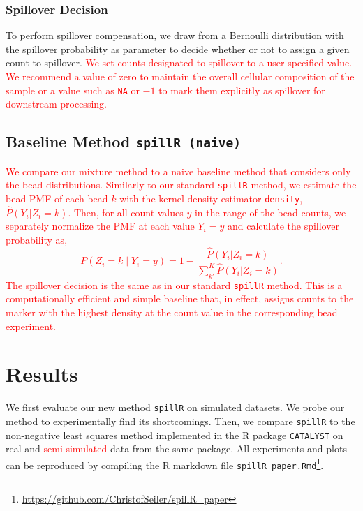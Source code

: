 \documentclass[
]{article}
\begin{document}
\subsubsection{Spillover Decision}\label{spillover-decision}

To perform spillover compensation, we draw from a Bernoulli distribution with the spillover probability as parameter to decide whether or not to assign a given count to spillover. \textcolor{red}{We set counts designated to spillover to a user-specified value. We recommend a value of zero to maintain the overall cellular composition of the sample or a value such as \texttt{NA} or $-1$ to mark them explicitly as spillover for downstream processing.}

\subsection{\texorpdfstring{Baseline Method \texttt{spillR\ (naive)}}{Baseline Method spillR (naive)}}\label{baseline-method-spillr-naive}

\textcolor{red}{
We compare our mixture method to a naive baseline method that considers only the bead distributions. Similarly to our standard \texttt{spillR} method, we estimate the bead PMF of each bead $k$ with the kernel density estimator \texttt{density}, $\widehat{P}(Y_i | Z_i = k)$. Then, for all count values $y$ in the range of the bead counts, we separately normalize the PMF at each value $Y_i = y$ and calculate the spillover probability as, 
$$
P(Z_i = k \mid Y_i = y) = 1 - \frac{\widehat{P}(Y_i | Z_i = k)}{\sum_{k'}^K \widehat{P}(Y_i | Z_i = k)}.
$$
The spillover decision is the same as in our standard \texttt{spillR} method. This is a computationally efficient and simple baseline that, in effect, assigns counts to the marker with the highest density at the count value in the corresponding bead experiment.
}

\section{Results}\label{results}

We first evaluate our new method \texttt{spillR} on simulated datasets. We probe our method to experimentally find its shortcomings. Then, we compare \texttt{spillR} to the non-negative least squares method implemented in the R package \texttt{CATALYST} on real and \textcolor{red}{semi-simulated} data from the same package. All experiments and plots can be reproduced by compiling the R markdown file \texttt{spillR\_paper.Rmd}\footnote{\url{https://github.com/ChristofSeiler/spillR_paper}}.
\end{document}
